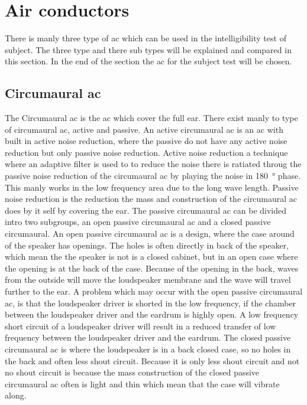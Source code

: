 \section{Air conductors}

There is manly three type of \gls{ac} which can be used in the intelligibility test of subject.  The three type and there sub types will be explained and compared in this section. In the end of the section the \gls{ac} for the subject test will be chosen.

\subsection{Circumaural \gls{ac}} \label{circumaural_ac}
The Circumaural \gls{ac} is the \gls{ac} which cover the full ear. There exist manly to type of circumaural \gls{ac}, active and passive. An active circumaural \gls{ac} is an \gls{ac} with built in active noise reduction, where the passive do not have any active noise reduction but only passive noise reduction. Active noise reduction a technique where an adaptive filter is used to to reduce the noise there is ratiated throug the passive noise reduction of the circumaural \gls{ac} by playing the noise in \SI{180}{\degree} phase. This manly works in the low frequency area due to the long wave length. Passive noise reduction is the reduction the mass and construction of the circumaural \gls{ac} does by it self by covering the ear. The passive circumaural \gls{ac} can be divided intro two subgroups, an open passive circumaural \gls{ac} and a closed passive circumaural. An open passive circumaural \gls{ac} is a design, where the case around of the speaker has openings. The holes is often directly in back of the speaker, which mean the the speaker is not is a closed cabinet, but in an open case where the opening is at the back of the case. Because of the opening in the back, waves from the outside will move the loudspeaker membrane and the wave will travel further to the ear. A problem which may occur with the open passive circumaural \gls{ac}, is that the loudspeaker driver is shorted in the low frequency, if the chamber between the loudspeaker driver and the eardrum is highly open. A low frequency short circuit of a loudspeaker driver will result in a reduced transfer of low frequency between the loudspeaker driver and the eardrum. The closed passive circumaural \gls{ac} is where the loudspeaker is in a back closed case, so no holes in the back and often less shout circuit. Because it is only less shout circuit and not no shout circuit is because the mass construction of the closed passive circumaural \gls{ac} often is light and thin which mean that the case will vibrate along.

